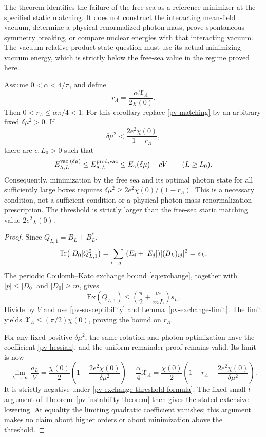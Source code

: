 The theorem identifies the failure of the free sea as a reference
minimizer at the specified static matching. It does not construct the
interacting mean-field vacuum, determine a physical renormalized photon
mass, prove spontaneous symmetry breaking, or compare nuclear energies
with that interacting vacuum. The vacuum-relative product-state question
must use its actual minimizing vacuum energy, which is strictly below
the free-sea value in the regime proved here.

\begin{corollary}
\label{pv-exchange-threshold}
Assume \(0<\alpha<4/\pi\), and define
\[
 r_\Lambda=\frac{\alpha\mathcal X_\Lambda}{2\chi(0)}.
\]
Then \(0<r_\Lambda\leq\alpha\pi/4<1\). For this corollary replace
\eqref{pv-matching} by an arbitrary fixed \(\delta\mu^2>0\).
If
\begin{equation}
 \delta\mu^2<
 \frac{2e^2\chi(0)}{1-r_\Lambda},
 \label{pv-exchange-threshold-formula}
\end{equation}
there are \(c,L_0>0\) such that
\[
 E^{\mathrm{vac},(\delta\mu)}_{\Lambda,L}
 \leq E^{\mathrm{prod,vac}}_{\Lambda,L}
 \leq E_\gamma(\delta\mu)-cV
 \qquad(L\geq L_0).
\]
Consequently, minimization by the free sea and its optimal photon state
for all sufficiently large boxes requires
\(\delta\mu^2\geq2e^2\chi(0)/(1-r_\Lambda)\). This is a necessary
condition, not a sufficient condition or a physical photon-mass
renormalization prescription. The threshold is strictly larger than the
free-sea static matching value \(2e^2\chi(0)\).
\end{corollary}
\begin{proof}
Since \(Q_{L,1}=B_L+B_L^*\),
\[
 \operatorname{Tr}\bigl(|D_0|Q_{L,1}^2\bigr)
 =\sum_{i+,j-}(E_i+|E_j|)|(B_L)_{ij}|^2=s_L.
\]
The periodic Coulomb--Kato exchange bound
\eqref{eq:exchange}, together with \(|p|\leq|D_0|\) and
\(|D_0|\geq m\), gives
\[
 \mathrm{Ex}(Q_{L,1})
 \leq\left(\frac\pi2+\frac{c_*}{mL}\right)s_L.
\]
Divide by \(V\) and use \eqref{pv-susceptibility} and
Lemma~\ref{pv-exchange-limit}. The limit yields
\(\mathcal X_\Lambda\leq(\pi/2)\chi(0)\), proving the bound on
\(r_\Lambda\).

For any fixed positive \(\delta\mu^2\), the same rotation and photon
optimization have the coefficient \eqref{pv-hessian}, and the uniform
remainder proof remains valid. Its limit is now
\[
 \lim_{L\to\infty}\frac{a_L}{V}
 =\frac{\chi(0)}2
    \left(1-\frac{2e^2\chi(0)}{\delta\mu^2}\right)
       -\frac\alpha4\mathcal X_\Lambda
 =\frac{\chi(0)}2
    \left(1-r_\Lambda-\frac{2e^2\chi(0)}{\delta\mu^2}\right).
\]
It is strictly negative under \eqref{pv-exchange-threshold-formula}.
The fixed-small-\(t\) argument of Theorem~\ref{pv-instability-theorem}
then gives the stated extensive lowering. At equality the limiting
quadratic coefficient vanishes; this argument makes no claim about
higher orders or about minimization above the threshold.
\end{proof}

